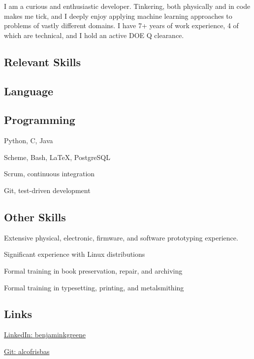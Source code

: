 \documentclass{cv}
\begin{document}
\linespread{0.9}
\noindent{}
I am a curious and enthusiastic developer. Tinkering, both physically and in code makes me tick,
and I deeply enjoy applying machine learning approaches to problems of vastly different domains.
I have 7+ years of work experience, 4 of which are technical, and I hold an active DOE Q clearance.
\begin{paracol}{2}
\begin{raggedright}
\section{Relevant Skills}
\subsection{Language}
\subsection{Programming}
\begin{closeitems}
\item Python, C, Java
\item Scheme, Bash, \LaTeX, PostgreSQL
\item Scrum, continuous integration
\item Git, test-driven development
\end{closeitems}
\subsection{Other Skills}
\begin{closeitems}
\item Extensive physical, electronic, firmware, and software prototyping experience.
\item Significant experience with Linux distributions
\item Formal training in book preservation, repair, and archiving
\item Formal training in typesetting, printing, and metalsmithing
\end{closeitems}
\subsection{Links}
\begin{closeitems}
\item \href{http://www.linkedin.com/in/benjaminkgreene}{LinkedIn: \small{benjaminkgreene}}
\item \href{http://www.github.com/alcofrisbas}{Git: \small{alcofrisbas}}
\end{closeitems}

\end{raggedright}
\end{paracol}
\end{document}

